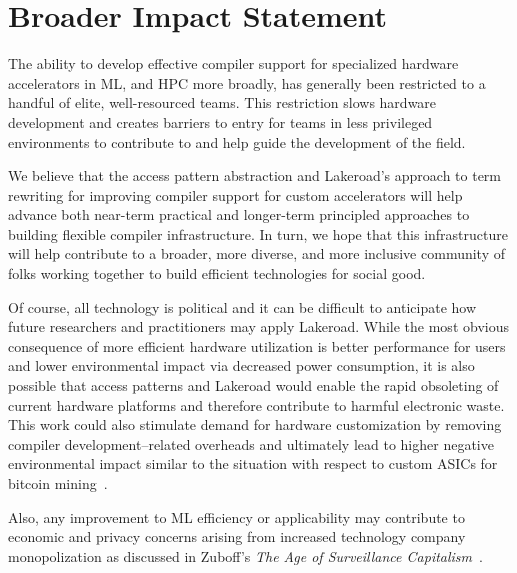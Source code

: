 \documentclass[prologue, dvipsnames, sigplan, screen, review, anonymous]{acmart}
\newcommand{\g}{Lakeroad\xspace}
\begin{document}




\clearpage
\section*{Broader Impact Statement}

The ability to develop effective compiler support for
  specialized hardware accelerators in ML,
  and HPC more broadly,
  has generally been restricted to a handful of
  elite, well-resourced teams.
This restriction slows hardware development
  and creates barriers to entry for teams in
  less privileged environments to contribute to
  and help guide the development of the field.

We believe that the access pattern abstraction
  and \g's approach to term rewriting for
  improving compiler support for custom
  accelerators will help advance both
  near-term practical and longer-term principled
  approaches to building flexible compiler infrastructure.
In turn, we hope that this infrastructure will
  help contribute to a broader, more diverse, and
  more inclusive community of folks working
  together to build efficient technologies for social
  good.
  
Of course, all technology is political and it can
  be difficult to anticipate how future
  researchers and practitioners may apply \g.
While the most obvious consequence of more
  efficient hardware utilization is better
  performance for users and lower environmental
  impact via decreased power consumption,
  it is also possible that access patterns and \g
  would enable the rapid obsoleting of current
  hardware platforms and therefore contribute
  to harmful electronic waste.
This work could also stimulate
  demand for hardware customization by
  removing compiler development--related overheads and
  ultimately lead to higher negative
  environmental impact similar to the
  situation with respect to custom ASICs
  for bitcoin mining~\cite{qin2020bitcoins}.

Also,
  any improvement to ML efficiency or applicability
  may contribute to economic and privacy concerns
  arising from increased technology company monopolization
  as discussed in Zuboff's
  \textit{The Age of Surveillance Capitalism}~\citep{surveillance}.
\end{document}
